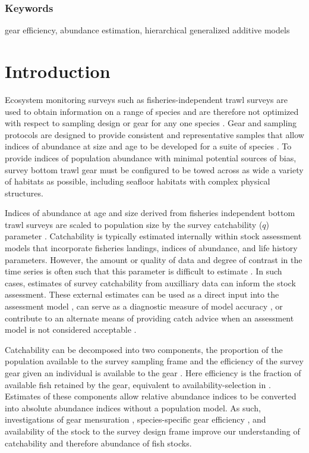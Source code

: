 \documentclass[
  12pt,
]{article}
\begin{document}
\hypertarget{keywords}{%
\subsubsection*{Keywords}\label{keywords}}

gear efficiency, abundance estimation, hierarchical generalized additive
models

\pagebreak

\hypertarget{introduction}{%
\section{Introduction}\label{introduction}}

Ecosystem monitoring surveys such as fisheries-independent trawl surveys
are used to obtain information on a range of species and are therefore
not optimized with respect to sampling design or gear for any one
species \citep{bijleveldetal12, wangetal18}. Gear and sampling protocols
are designed to provide consistent and representative samples that allow
indices of abundance at size and age to be developed for a suite of
species \citep{azarovitz81, thiessetal18}. To provide indices of
population abundance with minimal potential sources of bias, survey
bottom trawl gear must be configured to be towed across as wide a
variety of habitats as possible, including seafloor habitats with
complex physical structures.

Indices of abundance at age and size derived from fisheries independent
bottom trawl surveys are scaled to population size by the survey
catchability (\(q\)) parameter \citep{arreguinsanchez96}. Catchability
is typically estimated internally within stock assessment models that
incorporate fisheries landings, indices of abundance, and life history
parameters. However, the amount or quality of data and degree of
contrast in the time series is often such that this parameter is
difficult to estimate \citep{maunderpiner15}. In such cases, estimates
of survey catchability from auxilliary data can inform the stock
assessment. These external estimates can be used as a direct input into
the assessment model \citep{somertonetal99}, can serve as a diagnostic
measure of model accuracy \citep{milleretal19}, or contribute to an
alternate means of providing catch advice when an assessment model is
not considered acceptable \citep{legaultmccurdy17}.

Catchability can be decomposed into two components, the proportion of
the population available to the survey sampling frame and the efficiency
of the survey gear given an individual is available to the gear
\citep{paloheimodickie64}. Here efficiency is the fraction of available
fish retained by the gear, equivalent to availability-selection in
\citet{millarfryer99}. Estimates of these components allow relative
abundance indices to be converted into absolute abundance indices
without a population model. As such, investigations of gear mensuration
\citep{kotwickietal11}, species-specific gear efficiency
\citep{thygesenetal19,jonesetal21}, and availability of the stock to the
survey design frame \citep{nicholetal19} improve our understanding of
catchability and therefore abundance of fish stocks.
\end{document}
